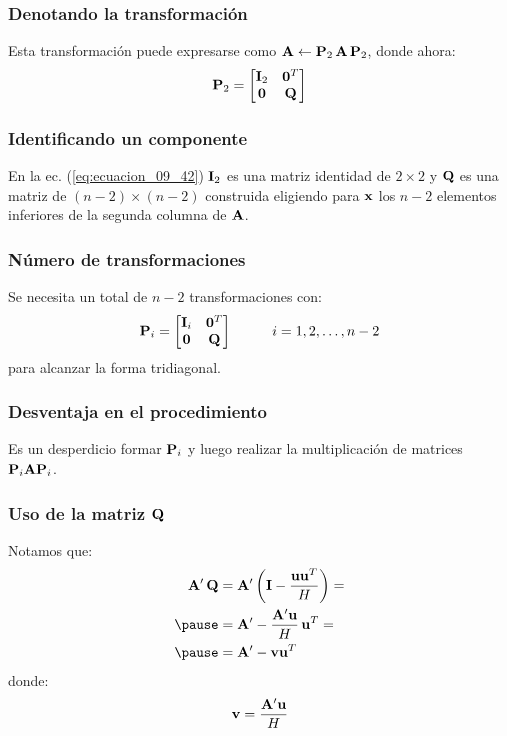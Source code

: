 \documentclass[12pt]{beamer}
\begin{document}
\begin{frame}
\frametitle{Denotando la transformación}
Esta transformación puede expresarse como $\vb{A} \leftarrow \vb{P}_{2} \, \vb{A} \, \vb{P}_{2}$, donde ahora:
\pause
\begin{align}
\vb{P}_{2} =
\begin{bmatrix}
\vb{I}_{2} & \vb{0}^{T} \\
\vb{0} & \vb{Q}
\end{bmatrix}
\label{eq:ecuacion_09_42}
\end{align}
\end{frame}
\begin{frame}
\frametitle{Identificando un componente}
En la ec. (\ref{eq:ecuacion_09_42}) $\vb{I}_{2}$ es una matriz identidad de $2 \times 2$ y $\vb{Q}$ es una matriz de $(n - 2) \times (n - 2)$ construida eligiendo para $\vb{x}$ los $n - 2$ elementos inferiores de la segunda columna de $\vb{A}$.
\end{frame}
\begin{frame}
\frametitle{Número de transformaciones}
Se necesita un total de $n - 2$ transformaciones con:
\pause
\begin{align*}
\vb{P}_{i} =
\begin{bmatrix}
\vb{I}_{i} & \vb{0}^{T} \\
\vb{0} & \vb{Q}
\end{bmatrix} \hspace{1cm} i = 1, 2, \ldots, n - 2
\end{align*}
para alcanzar la forma tridiagonal.
\end{frame}
\begin{frame}
\frametitle{Desventaja en el procedimiento}
Es un desperdicio formar $\vb{P}_{i}$ y luego realizar la multiplicación de matrices $\vb{P}_{i} \vb{A} \vb{P}_{i}$.
\end{frame}
\begin{frame}
\frametitle{Uso de la matriz $\vb{Q}$}
Notamos que:
\pause
\begin{eqnarray*}
\begin{aligned}
\pderivada{\vb{A}} \, \vb{Q} &= \pderivada{\vb{A}} \left( \vb{I} - \dfrac{\vb{u} \vb{u}^{T}}{H} \right) = \\ \pause
&= \pderivada{\vb{A}} - \dfrac{\pderivada{\vb{A}} \vb{u}}{H} \, \vb{u}^{T} = \\ \pause
&= \pderivada{\vb{A}} - \vb{v} \vb{u}^{T}
\end{aligned}
\end{eqnarray*}
\pause
donde:
\begin{align}
\vb{v} = \dfrac{{\vb{A}}^{\prime} \vb{u}}{H}
\label{eq:ecuacion_09_43}
\end{align}
\end{frame}
\end{document}
